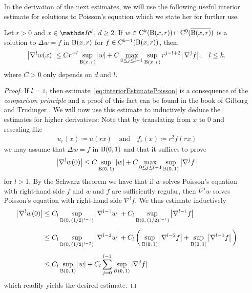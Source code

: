 In the derivation of the next estimates, we will use the following useful interior estimate for solutions to Poisson's equation which we state her for further use.
\begin{lem}
  \label{lem:interiorEstimatePoisson}
  Let $r > 0$ and $x \in \R^d$, $d \geq 2$. 
  If $w \in \mathrm{C}^{k}(\mathrm{B}(x,r)) \cap \mathrm{C}^0(\overline{\mathrm{B}(x,r)})$ is a solution to $\Delta w = f$ in $\mathrm{B}(x,r)$ for $f \in \mathrm{C}^{k - 1}(\mathrm{B}(x,r))$, then,
  \begin{align}
    \label{eq:interiorEstimatePoisson}
    \big|\nabla^l w(x)\big| \leq C r^{-l} \sup_{\mathrm{B}(x,\,r)} |w| + C \max_{0 \leq j \leq l - 1} \sup_{\mathrm{B}(x,\,r)} r^{j - l + 2} \, \big|\nabla^j f\big|, \quad l \leq k,
  \end{align}
  where $C > 0$ only depends on $d$ and $l$.
\end{lem}

\begin{proof}
  If $l = 1$, then estimate~\eqref{eq:interiorEstimatePoisson} is a consequence of the \emph{comparison principle} and a proof of this fact can be found in the book of Gilbarg and Trudinger \cite[Sec.\@~3.4,~~ Eq.\@~(3.16)]{gilbarg}.
  We will now use this estimate to inductively deduce the estimates for higher derivatives:
  Note that by translating from $x$ to $0$ and rescaling like
  \begin{align*}
    u_r(x) \coloneqq u(rx) \quad\text{and}\quad f_r(x) \coloneqq r^2 f(rx)
  \end{align*}
  we may assume that $\Delta w = f$ in $\mathrm{B}(0,1)$ and that it suffices to prove
  \begin{align}
    \label{eq:interiorEstimatePoissonSimple}
    \big|\nabla^l w(0) \big| \leq C \sup_{\mathrm{B}(0,\,1)} |w| + C \max_{0 \leq j \leq l - 1} \sup_{\mathrm{B}(0,\,1)} \big|\nabla^j f\big|
  \end{align}
  for $l > 1$.
  By the Schwarz theorem we have that if $w$ solves Poisson's equation with right-hand side $f$ and $w$ and $f$ are sufficiently regular, then $\nabla^l w$ solves Poisson's equation with right-hand side $\nabla^l f$.
  We thus estimate inductively
  \begin{align*}
    \big|\nabla^l w(0)\big|
    &\leq C_l \sup_{\mathrm{B}(0,\, (1/2)^{l - 1})} \big|\nabla^{l - 1} w\big| + C_l \sup_{\mathrm{B}(0,\, (1/2)^{l-1})} \big|\nabla^{l - 1} f\big| \\[0.5em]
    &\leq C_l \sup_{\mathrm{B}(0,\, (1/2)^{l-2})} \big|\nabla^{l - 2} w\big| + C_l\, \bigg(\sup_{\mathrm{B}(0,\,1)} \big|\nabla^{l - 2} f\big| + \sup_{\mathrm{B}(0,\,1)} \big|\nabla^{l - 1} f\big| \,\bigg) \\[0.5em]
    &\leq C_l  \sup_{\mathrm{B}(0,\,1)} |w| + C_l \sum_{j = 0}^{l - 1} \sup_{B(0,\,1)} |\nabla^j f|
  \end{align*}
  which readily yields the desired estimate.
\end{proof}

